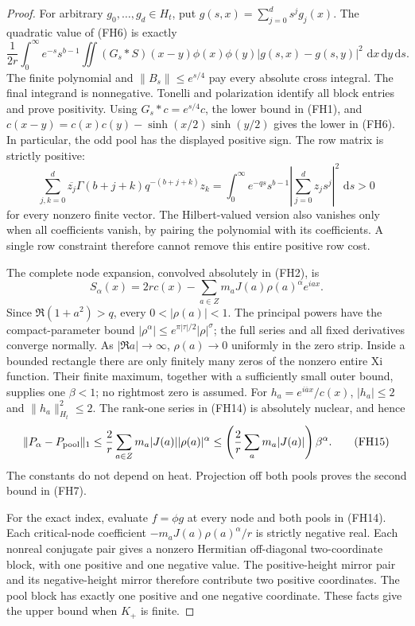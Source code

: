 \documentclass[11pt]{article}
\theoremstyle{remark}\newtheorem{remark}[theorem]{Remark}
\newcommand{\dd}{\,\mathrm d}
\begin{document}
\begin{proof}
For arbitrary \(g_0,\ldots,g_d\in H_t\), put
\(g(s,x)=\sum_{j=0}^d s^jg_j(x)\). The quadratic value of (FH6) is
exactly
\[
 \frac1{2r}\int_0^\infty e^{-s}s^{b-1}
   \iint(G_s*S)(x-y)\phi(x)\phi(y)
                 |g(s,x)-g(s,y)|^2\,\dd x\dd y\dd s .    \tag{FH12}
\]
The finite polynomial and \(\|B_s\|\le e^{s/4}\) pay every absolute
cross integral. The final integrand is nonnegative. Tonelli and
polarization identify all block entries and prove positivity.
Using \(G_s*c=e^{s/4}c\), the lower bound in (FH1), and
\(c(x-y)=c(x)c(y)-\sinh(x/2)\sinh(y/2)\) gives the lower in (FH6).
In particular, the odd pool has the displayed positive sign.
The row matrix is strictly positive:
\[
 \sum_{j,k=0}^d\overline{z_j}\Gamma(b+j+k)q^{-(b+j+k)}z_k
  =\int_0^\infty e^{-qs}s^{b-1}|\sum_{j=0}^d z_js^j|^2\,\dd s>0
                                                               \tag{FH13}
\]
for every nonzero finite vector. The Hilbert-valued version also
vanishes only when all coefficients vanish, by pairing the polynomial
with its coefficients. A single row constraint therefore cannot
remove this entire positive row cost.

The complete node expansion, convolved absolutely in (FH2), is
\[
 S_\alpha(x)=2rc(x)-\sum_{a\in Z}m_aJ(a)\rho(a)^\alpha e^{iax}.
                                                               \tag{FH14}
\]
Since \(\Re(1+a^2)>q\), every \(0<|\rho(a)|<1\).
The principal powers have the compact-parameter bound
\(|\rho^\alpha|\le e^{\pi|\tau|/2}|\rho|^\sigma\); the full series
and all fixed derivatives converge normally. As \(|\Re a|\to\infty\),
\(\rho(a)\to0\) uniformly in the zero strip. Inside a bounded
rectangle there are only finitely many zeros of the nonzero entire
Xi function. Their finite maximum, together with a sufficiently
small outer bound, supplies one \(\beta<1\); no rightmost zero is
assumed. For \(h_a=e^{i\overline a x}/c(x)\),
\(|h_a|\le2\) and \(\|h_a\|_{H_t}^2\le2\).
The rank-one series in (FH14) is absolutely nuclear, and hence
\[
 \|P_\alpha-P_{\rm pool}\|_1
   \le\frac2r\sum_{a\in Z}m_a|J(a)||\rho(a)|^\alpha
   \le\left(\frac2r\sum_am_a|J(a)|\right)\beta^\alpha .    \tag{FH15}
\]
The constants do not depend on heat. Projection off both pools proves
the second bound in (FH7).

For the exact index, evaluate \(f=\phi g\) at every node and both
pools in (FH14). Each critical-node coefficient
\(-m_aJ(a)\rho(a)^\alpha/r\) is strictly negative real.
Each nonreal conjugate pair gives a nonzero Hermitian off-diagonal
two-coordinate block, with one positive and one negative value.
The positive-height mirror pair and its negative-height mirror
therefore contribute two positive coordinates. The pool block has
exactly one positive and one negative coordinate. These facts give
the upper bound when \(K_+\) is finite.


\end{proof}
\end{document}
